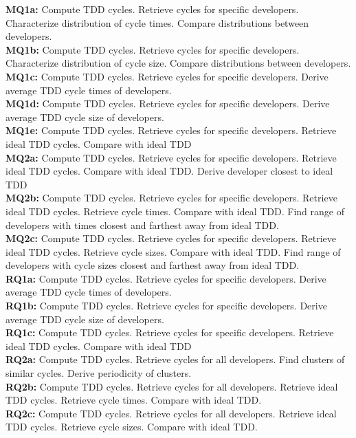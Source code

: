 \documentclass[journal]{vgtc}                %
\begin{document}
\noindent\textbf{MQ1a:} Compute TDD cycles. Retrieve cycles for specific developers. Characterize distribution of cycle times. Compare distributions between developers. \\
\textbf{MQ1b:} Compute TDD cycles. Retrieve cycles for specific developers. Characterize distribution of cycle size. Compare distributions between developers. \\
\textbf{MQ1c:} Compute TDD cycles. Retrieve cycles for specific developers. Derive average TDD cycle times of developers. \\
\textbf{MQ1d:} Compute TDD cycles. Retrieve cycles for specific developers. Derive average TDD cycle size of developers. \\
\textbf{MQ1e:} Compute TDD cycles. Retrieve cycles for specific developers. Retrieve ideal TDD cycles. Compare with ideal TDD \\
 
\noindent\textbf{MQ2a:} Compute TDD cycles. Retrieve cycles for specific developers. Retrieve ideal TDD cycles. Compare with ideal TDD. Derive developer closest to ideal TDD \\
\textbf{MQ2b:} Compute TDD cycles. Retrieve cycles for specific developers. Retrieve ideal TDD cycles. Retrieve cycle times. Compare with ideal TDD. Find range of developers with times closest and farthest away from ideal TDD. \\
\textbf{MQ2c:} Compute TDD cycles. Retrieve cycles for specific developers. Retrieve ideal TDD cycles. Retrieve cycle sizes. Compare with ideal TDD. Find range of developers with cycle sizes closest and farthest away from ideal TDD. \\
 
\noindent\textbf{RQ1a:} Compute TDD cycles. Retrieve cycles for specific developers. Derive average TDD cycle times of developers. \\
\textbf{RQ1b:} Compute TDD cycles. Retrieve cycles for specific developers. Derive average TDD cycle size of developers. \\
\textbf{RQ1c:} Compute TDD cycles. Retrieve cycles for specific developers. Retrieve ideal TDD cycles. Compare with ideal TDD \\
 
\noindent\textbf{RQ2a:} Compute TDD cycles. Retrieve cycles for all developers. Find clusters of similar cycles. Derive periodicity of clusters. \\
\textbf{RQ2b:} Compute TDD cycles. Retrieve cycles for all developers. Retrieve ideal TDD cycles. Retrieve cycle times. Compare with ideal TDD. \\
\textbf{RQ2c:} Compute TDD cycles. Retrieve cycles for all developers. Retrieve ideal TDD cycles. Retrieve cycle sizes. Compare with ideal TDD. \\
\end{document}
